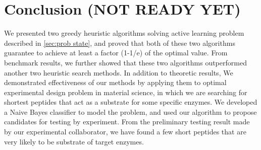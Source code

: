 \documentclass[opre,nonblindrev]{informs3} %
\begin{document}
\section{Conclusion (NOT READY YET)}
We presented two greedy heuristic algorithms solving active learning problem described in \ref{sec:prob state}, and proved that both of these two algorithms guarantee to achieve at least a factor (1-1/e) of the optimal value. From benchmark results, we further showed that these two algorithms outperformed another two heuristic search methods. In addition to theoretic results, We demonstrated effectiveness of our methods by applying them to optimal experimental design problem in material science, in which we are searching for shortest peptides that act as a substrate for some specific enzymes. We developed a Naive Bayes classifier to model the problem, and used our algorithm to propose candidates for testing by experiment. From the preliminary testing result made by our experimental collaborator, we have found a few short peptides that are very likely to be substrate of target enzymes.

%
%
%





\end{document}
